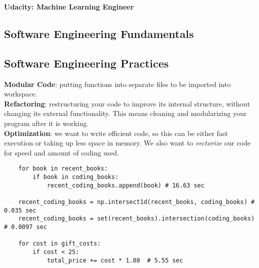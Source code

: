 \documentclass[11pt, a4paper]{article}
\begin{document}
	\begin{titlepage}
		\begin{center} \Huge \textbf{Udacity: Machine Learning Engineer} \end{center}
		\tableofcontents
		\newpage
	\end{titlepage}

	\begin{spacing}{1.1}
	\section{Software Engineering Fundamentals}
	\subsection{Software Engineering Practices}
	\textbf{Modular Code}: putting functions into separate files to be imported into workspace. \vspace*{2mm}\\
	\textbf{Refactoring}: restructuring your code to improve its internal structure, without changing its external functionality. This means cleaning and modularizing your program after it is working. \vspace*{2mm}\\
	\textbf{Optimization}: we want to write efficient code, so this can be either fast execution or taking up less space in memory. We also want to \textit{vectorize} our code for speed and amount of coding used.
	\begin{lstlisting}
	for book in recent_books:
		if book in coding_books:
			recent_coding_books.append(book) # 16.63 sec
			
	recent_coding_books = np.intersect1d(recent_books, coding_books) # 0.035 sec
	recent_coding_books = set(recent_books).intersection(coding_books) # 0.0097 sec
	
	for cost in gift_costs:
		if cost < 25:
			total_price += cost * 1.08  # 5.55 sec
			

\end{lstlisting}
\end{spacing}
\end{document}
